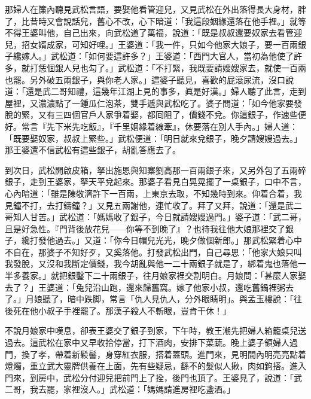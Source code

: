 那婦人在簾內聽見武松言語，要娶他看管迎兒，又見武松在外出落得長大身材，胖了，比昔時又會說話兒，舊心不改，心下暗道：「我這段姻緣還落在他手裡。」就等不得王婆叫他，{}自己出來，向武松道了萬福，說道：「既是叔叔還要奴家去看管迎兒，招女婿成家，可知好哩。」王婆道：「我一件，只如今他家大娘子，要一百兩銀子纔嫁人。」武松道：「如何要這許多？」王婆道：「西門大官人，當初為他使了許多，就打恁個銀人兒也勾了。」武松道：「不打緊，我既要請嫂嫂家去，就使一百兩也罷。另外破五兩銀子，與你老人家。」這婆子聽見，喜歡的屁滾尿流，沒口說道：「還是武二哥知禮，這幾年江湖上見的事多，眞是好漢。」婦人聽了此言，走到屋裡，又濃濃點了一鍾瓜仁泡茶，雙手遞與武松吃了。婆子問道：「如今他家要發脫的緊，又有三四個官戶人家爭着娶，都囘阻了，價錢不兌。你這銀子，作速些便好。常言『先下米先吃飯』，『千里姻緣着線牽』，休要落在別人手內。」婦人道：「既要娶奴家，叔叔上緊些。」{}武松便道：「明日就來兌銀子，晚夕請嫂嫂過去。」那王婆還不信武松有這些銀子，胡亂答應去了。

到次日，武松開啟皮箱，拏出施恩與知寨劉高那一百兩銀子來，又另外包了五兩碎銀子，走到王婆家，拏天平兌起來。那婆子看見白晃晃擺了一桌銀子，口中不言，心內暗道：「雖是陳敬濟許下一百兩，上東京去取，不知幾時到來。仰着合着，我見鐘不打，去打鑄鐘？」又見五兩謝他，連忙收了。拜了又拜，說道：「還是武二哥知人甘苦。」武松道：「媽媽收了銀子，今日就請嫂嫂過門。」婆子道：「武二哥，且是好急性。『門背後放花兒——你等不到晚了』？{}也待我往他大娘那裡交了銀子，纔打發他過去。」又道：「你今日帽兒光光，晚夕做個新郎。」那武松緊着心中不自在，那婆子不知好歹，又奚落他。打發武松出門，自己尋思：「他家大娘只叫我發脫，又沒和我斷定價錢，我今胡亂與他一二十兩銀子就是了，綁着鬼也落他一半多養家。」就把銀鑿下二十兩銀子，往月娘家裡交割明白。月娘問：「甚麼人家娶去了？」王婆道：「兔兒沿山跑，還來歸舊窩。嫁了他家小叔，還吃舊鍋裡粥去了。」月娘聽了，暗中跌脚，常言「仇人見仇人，分外眼睛明」。與孟玉樓說：「往後死在他小叔子手裡罷了。{}那漢子殺人不斬眼，豈肯干休！」

不說月娘家中嘆息，卻表王婆交了銀子到家，下午時，教王潮先把婦人箱籠桌兒送過去。這武松在家中又早收拾停當，打下酒肉，安排下菜蔬。晚上婆子領婦人過門，換了孝，帶着新鬏髻，身穿紅衣服，搭着蓋頭。進門來，見明間內明亮亮點着燈燭，重立武大靈牌供養在上面，先有些疑忌，繇不的髮似人揪，肉如鉤搭。進入門來，到房中，武松分付迎兒把前門上了拴，後門也頂了。王婆見了，說道：「武二哥，我去罷，家裡沒人。」武松道：「媽媽請進房裡吃盞酒。」

